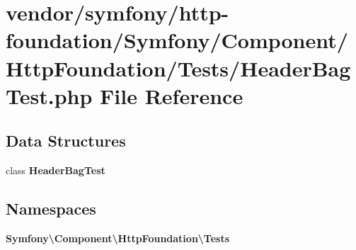 \section{vendor/symfony/http-\/foundation/\+Symfony/\+Component/\+Http\+Foundation/\+Tests/\+Header\+Bag\+Test.php File Reference}
\label{_header_bag_test_8php}
\subsection*{Data Structures}
\begin{DoxyCompactItemize}
\item 
class {\bf Header\+Bag\+Test}
\end{DoxyCompactItemize}
\subsection*{Namespaces}
\begin{DoxyCompactItemize}
\item 
 {\bf Symfony\textbackslash{}\+Component\textbackslash{}\+Http\+Foundation\textbackslash{}\+Tests}
\end{DoxyCompactItemize}
